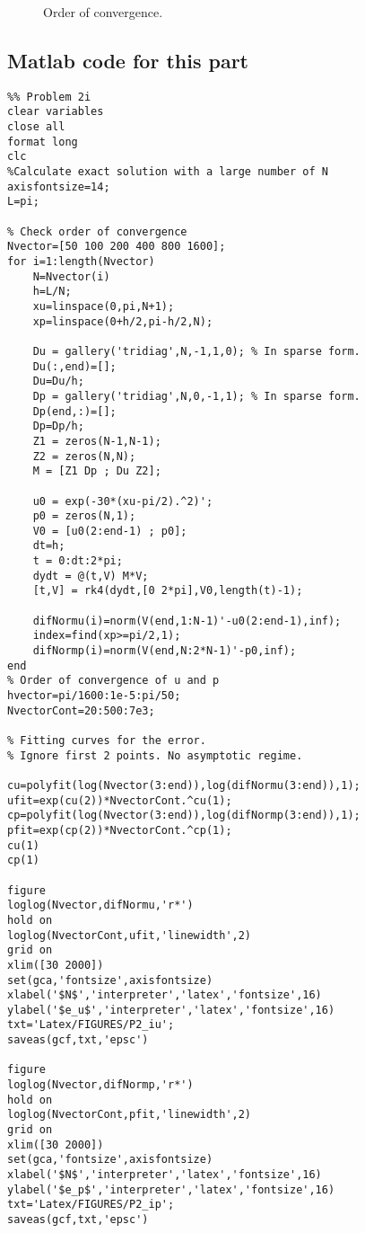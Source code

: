 \begin{enumerate}
\begin{figure}[H]
\centering     %
\hspace*{\fill}
\hfill
{}
\hspace*{\fill}
\caption{Order of convergence.}
\end{figure}
\subsection*{Matlab code for this part}
\begin{verbatim}
%% Problem 2i
clear variables
close all
format long
clc
%Calculate exact solution with a large number of N
axisfontsize=14;
L=pi;

% Check order of convergence
Nvector=[50 100 200 400 800 1600];
for i=1:length(Nvector)
    N=Nvector(i)
    h=L/N;
    xu=linspace(0,pi,N+1);
    xp=linspace(0+h/2,pi-h/2,N);
    
    Du = gallery('tridiag',N,-1,1,0); % In sparse form.
    Du(:,end)=[];
    Du=Du/h;
    Dp = gallery('tridiag',N,0,-1,1); % In sparse form.
    Dp(end,:)=[];
    Dp=Dp/h;
    Z1 = zeros(N-1,N-1);
    Z2 = zeros(N,N);
    M = [Z1 Dp ; Du Z2];
    
    u0 = exp(-30*(xu-pi/2).^2)';
    p0 = zeros(N,1);
    V0 = [u0(2:end-1) ; p0];
    dt=h;
    t = 0:dt:2*pi;
    dydt = @(t,V) M*V;
    [t,V] = rk4(dydt,[0 2*pi],V0,length(t)-1);
    
    difNormu(i)=norm(V(end,1:N-1)'-u0(2:end-1),inf);
    index=find(xp>=pi/2,1);
    difNormp(i)=norm(V(end,N:2*N-1)'-p0,inf);
end
% Order of convergence of u and p
hvector=pi/1600:1e-5:pi/50;
NvectorCont=20:500:7e3;

% Fitting curves for the error.
% Ignore first 2 points. No asymptotic regime.

cu=polyfit(log(Nvector(3:end)),log(difNormu(3:end)),1);
ufit=exp(cu(2))*NvectorCont.^cu(1);
cp=polyfit(log(Nvector(3:end)),log(difNormp(3:end)),1);
pfit=exp(cp(2))*NvectorCont.^cp(1);
cu(1)
cp(1)

figure
loglog(Nvector,difNormu,'r*')
hold on
loglog(NvectorCont,ufit,'linewidth',2)
grid on
xlim([30 2000])
set(gca,'fontsize',axisfontsize)
xlabel('$N$','interpreter','latex','fontsize',16)
ylabel('$e_u$','interpreter','latex','fontsize',16)
txt='Latex/FIGURES/P2_iu';
saveas(gcf,txt,'epsc')

figure
loglog(Nvector,difNormp,'r*')
hold on
loglog(NvectorCont,pfit,'linewidth',2)
grid on
xlim([30 2000])
set(gca,'fontsize',axisfontsize)
xlabel('$N$','interpreter','latex','fontsize',16)
ylabel('$e_p$','interpreter','latex','fontsize',16)
txt='Latex/FIGURES/P2_ip';
saveas(gcf,txt,'epsc')
\end{verbatim}


\end{enumerate}
